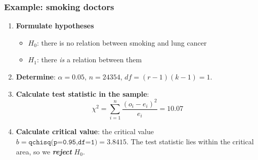 \documentclass{beamer}
\begin{document}
\begin{frame}
  \frametitle{Example: smoking doctors}
  \begin{enumerate}
  \item \textbf{Formulate hypotheses}
    \begin{itemize}
      \item $H_{0}$: there is no relation between smoking and lung cancer
      \item $H_{1}$: there \emph{is} a relation between them
    \end{itemize}
  \item \textbf{Determine}: $\alpha = 0.05$, $n = 24354$, $df = (r-1)(k-1) = 1$.
  \item \textbf{Calculate test statistic in the sample}:
  \[ \chi^{2} = \sum_{i=1}^{n} \frac{(o_{i} - e_{i})^{2}}{e_{i}} = 10.07 \]
  \item \textbf{Calculate critical value}: the critical value $b = \texttt{qchisq(p=0.95,df=1)} = 3.8415$. The test statistic lies within the critical area, so we \textbf{\textit{reject}} $H_{0}$.
\end{enumerate}
\end{frame}
\end{document}
